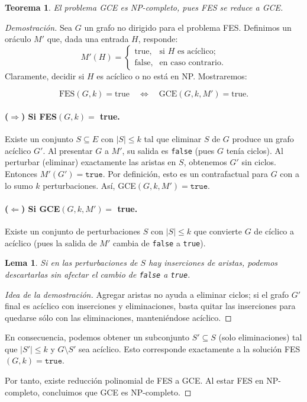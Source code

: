 \documentclass[a4paper]{article}
\newtheorem{theorem}{Teorema}
\newtheorem{lemma}{Lema}
\begin{document}
\begin{theorem}\label{thm:NP}
El problema GCE es NP-completo, pues FES se reduce a GCE.  
\end{theorem}

\begin{proof}[Demostración]
Sea $G$ un grafo no dirigido para el problema FES.  
Definimos un oráculo $M'$ que, dada una entrada $H$, responde:
\[
 M'(H) = 
 \begin{cases}
   \text{true}, & \text{si }H\text{ es acíclico;}\\
   \text{false}, & \text{en caso contrario.}
 \end{cases}
\]
Claramente, decidir si $H$ es acíclico o no está en NP.  
Mostraremos:

\[
\text{FES}(G,k) = \text{true} 
\quad \Longleftrightarrow \quad
\text{GCE}(G, k, M') = \text{true}.
\]

\paragraph{($\Rightarrow$) Si FES$(G,k) =$ true.}
Existe un conjunto $S \subseteq E$ con $|S|\leq k$ tal que eliminar $S$ de $G$ produce un grafo acíclico $G'$.  
Al presentar $G$ a $M'$, su salida es \texttt{false} (pues $G$ tenía ciclos).  
Al perturbar (eliminar) exactamente las aristas en $S$, obtenemos $G'$ sin ciclos.  
Entonces $M'(G') = \texttt{true}$.  
Por definición, esto es un contrafactual para $G$ con a lo sumo $k$ perturbaciones.  
Así, GCE$(G,k,M') = \texttt{true}$.

\paragraph{($\Leftarrow$) Si GCE$(G, k, M') =$ true.}
Existe un conjunto de perturbaciones $S$ con $|S| \leq k$ que convierte $G$ de cíclico a acíclico (pues la salida de $M'$ cambia de \texttt{false} a \texttt{true}).  

\begin{lemma}\label{lemma:eliminar_aristas}
Si en las perturbaciones de $S$ hay inserciones de aristas, podemos descartarlas sin afectar el cambio de \texttt{false} a \texttt{true}. 
\end{lemma}
\begin{proof}[Idea de la demostración]
Agregar aristas no ayuda a eliminar ciclos; si el grafo $G'$ final es acíclico con inserciones y eliminaciones, basta quitar las inserciones para quedarse sólo con las eliminaciones, manteniéndose acíclico.  
\end{proof}

En consecuencia, podemos obtener un subconjunto $S'\subseteq S$ (solo eliminaciones) tal que $|S'|\le k$ y $G\setminus S'$ sea acíclico.  
Esto corresponde exactamente a la solución FES$(G,k)=\texttt{true}$.  

\noindent
Por tanto, existe reducción polinomial de FES a GCE.  
Al estar FES en NP-completo, concluimos que GCE es NP-completo.  

\end{proof}
\end{document}
